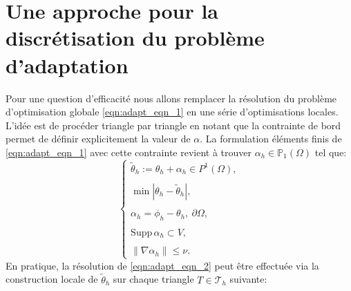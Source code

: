 \chapter{Une approche pour la discrétisation du problème d'adaptation}
\label{discr_adapt}
Pour une question d’efficacité nous allons remplacer la résolution du problème d’optimisation globale \eqref{eqn:adapt_eqn_1} en une série d’optimisations locales. L’idée est de procéder triangle par triangle en notant que la contrainte de bord permet de définir explicitement la valeur de $\alpha$. La formulation éléments finis de \eqref{eqn:adapt_eqn_1} avec cette contrainte revient à trouver $\alpha_h\in\mathbb{P}_1(\Omega)$ tel que:
\begin{equation}
\begin{cases}
\tilde{\theta}_h := \theta_h + \alpha_h \in P^1(\Omega), \\\\
\min \left|\theta_h - \tilde{\theta}_h\right|, \\\\
\alpha_h = \phi_h - \theta_h, \ \partial\Omega, \\\\
\text{Supp}\,\alpha_h \subset V, \\\\
\|\nabla\alpha_h\| \leq \nu.
\end{cases}
\label{eqn:adapt_eqn_2}
\end{equation}
En pratique, la résolution de \eqref{eqn:adapt_eqn_2} peut être effectuée via la construction locale de $\tilde{\theta}_h$ sur chaque triangle $T\in\mathcal{T}_h$ suivante:\\
